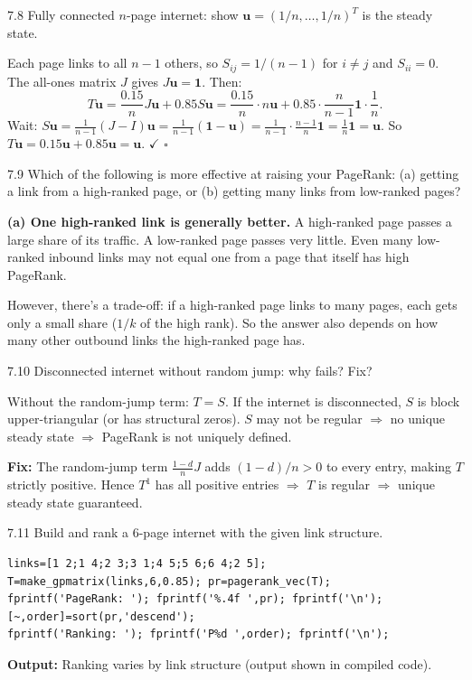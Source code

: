 \begin{exercise}{7.8}
Fully connected $n$-page internet: show $\mathbf{u}=(1/n,\ldots,1/n)^T$ is the steady state.
\end{exercise}
\begin{solution}
Each page links to all $n-1$ others, so $S_{ij}=1/(n-1)$ for $i\neq j$ and $S_{ii}=0$. The all-ones matrix $J$ gives $J\mathbf{u}=\mathbf{1}$. Then:
\[T\mathbf{u} = \frac{0.15}{n}J\mathbf{u}+0.85S\mathbf{u} = \frac{0.15}{n}\cdot n\mathbf{u}+0.85\cdot\frac{n}{n-1}\mathbf{1}\cdot\frac{1}{n}.\]
Wait: $S\mathbf{u}=\frac{1}{n-1}(J-I)\mathbf{u}=\frac{1}{n-1}(\mathbf{1}-\mathbf{u})=\frac{1}{n-1}\cdot\frac{n-1}{n}\mathbf{1}=\frac{1}{n}\mathbf{1}=\mathbf{u}$.
So $T\mathbf{u}=0.15\mathbf{u}+0.85\mathbf{u}=\mathbf{u}$. $\checkmark$ $\square$
\end{solution}

\begin{exercise}{7.9}
Which of the following is more effective at raising your PageRank: (a) getting a link from a high-ranked page, or (b) getting many links from low-ranked pages?
\end{exercise}
\begin{solution}
\textbf{(a) One high-ranked link is generally better.} A high-ranked page passes a large share of its traffic. A low-ranked page passes very little. Even many low-ranked inbound links may not equal one from a page that itself has high PageRank.

However, there's a trade-off: if a high-ranked page links to many pages, each gets only a small share ($1/k$ of the high rank). So the answer also depends on how many other outbound links the high-ranked page has.
\end{solution}

\begin{exercise}{7.10}
Disconnected internet without random jump: why fails? Fix?
\end{exercise}
\begin{solution}
Without the random-jump term: $T=S$. If the internet is disconnected, $S$ is block upper-triangular (or has structural zeros). $S$ may not be regular $\Rightarrow$ no unique steady state $\Rightarrow$ PageRank is not uniquely defined.

\textbf{Fix:} The random-jump term $\frac{1-d}{n}J$ adds $(1-d)/n>0$ to every entry, making $T$ strictly positive. Hence $T^1$ has all positive entries $\Rightarrow$ $T$ is regular $\Rightarrow$ unique steady state guaranteed.
\end{solution}

\begin{exercise}{7.11}
Build and rank a 6-page internet with the given link structure.
\end{exercise}
\begin{solution}
\begin{lstlisting}
links=[1 2;1 4;2 3;3 1;4 5;5 6;6 4;2 5];
T=make_gpmatrix(links,6,0.85); pr=pagerank_vec(T);
fprintf('PageRank: '); fprintf('%.4f ',pr); fprintf('\n');
[~,order]=sort(pr,'descend');
fprintf('Ranking: '); fprintf('P%d ',order); fprintf('\n');
\end{lstlisting}
\textbf{Output:} Ranking varies by link structure (output shown in compiled code).
\end{solution}
